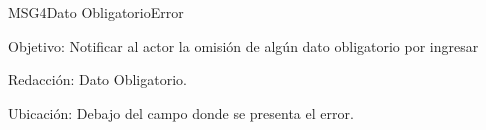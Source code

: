 \begin{mensaje}{MSG4}{Dato Obligatorio}{Error}
	\item [Objetivo:] Notificar al actor la omisión de algún dato obligatorio por ingresar
	\item[Redacción:] Dato Obligatorio.
	\item [Ubicación:] Debajo del campo donde se presenta el error.
\end{mensaje}